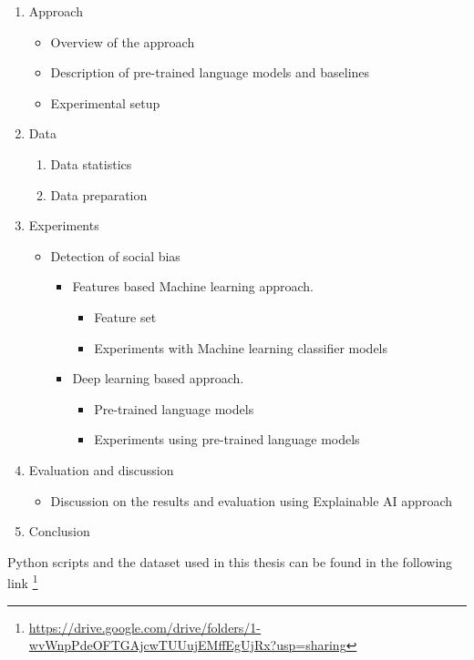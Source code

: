 \begin{enumerate}
\begin{enumerate}
        \end{enumerate}
    \item Approach 
        \begin{itemize}
        \item Overview of the approach
        \item Description of pre-trained language models and baselines
        \item Experimental setup
        \end{itemize} 
    \item Data 
        \begin{enumerate}
            \item Data statistics 
            \item Data preparation 
        \end{enumerate}
    \item Experiments 
        \begin{itemize}
        \item Detection of social bias
            \begin{itemize}
                \item Features based Machine learning approach.
                \begin{itemize}
                    \item Feature set
                    \item Experiments with Machine learning classifier models
                \end{itemize}
                \item Deep learning based approach. 
                 \begin{itemize}
                    \item Pre-trained language models
                    \item Experiments using pre-trained language models
                \end{itemize}
            \end{itemize}
        \end{itemize}
    \item Evaluation and discussion 
        \begin{itemize}
            \item Discussion on the results and evaluation using Explainable AI approach
        \end{itemize}
    \item Conclusion
\end{enumerate}

Python scripts and the dataset used in this thesis can be found in the following link \footnote{\url{https://drive.google.com/drive/folders/1-wvWnpPdeOFTGAjcwTUUujEMffEgUjRx?usp=sharing}}